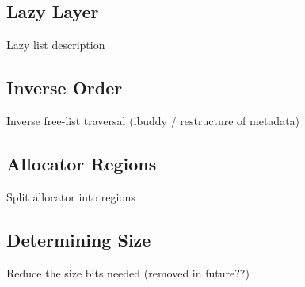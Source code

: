 \subsection{Lazy Layer}
Lazy list description

\subsection{Inverse Order}

Inverse free-list traversal (ibuddy / restructure of metadata)


\subsection{Allocator Regions}
Split allocator into regions


\subsection{Determining Size}

Reduce the size bits needed (removed in future??)
